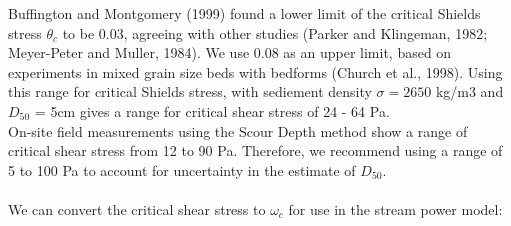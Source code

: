 \documentclass[12pt]{article}
\begin{document}
Buffington and Montgomery (1999) found a lower limit of the critical Shields stress $\theta_c$ to be 0.03, agreeing with other studies (Parker and Klingeman, 1982; Meyer-Peter and Muller, 1984). We use 0.08 as an upper limit, based on experiments in mixed grain size beds with bedforms (Church et al., 1998). Using this range for critical Shields stress, with sediement density $\sigma = 2650$ kg/m3 and $D_{50}$ = 5cm gives a range for critical shear stress of 24 - 64 Pa. 
\\
On-site field measurements using the Scour Depth method show a range of critical shear stress from 12 to 90 Pa. Therefore, we recommend using a range of 5 to 100 Pa to account for uncertainty in the estimate of $D_{50}$.
\\
\\
\noindent
We can convert the critical shear stress to $\omega_c$ for use in the stream power model:
\end{document}
